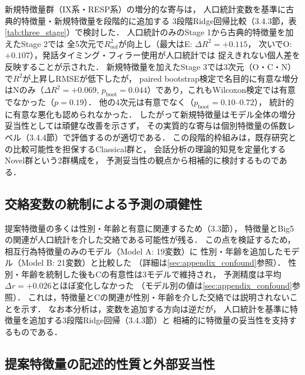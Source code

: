 \documentclass[dvipdfmx,11pt,a4paper]{bxjsarticle}
\renewcommand{\_}{\paperorigunderscore\allowbreak}%
\begin{document}
新規特徴量群（IX系・RESP系）の増分的な寄与は，
人口統計変数を基準に古典的特徴量・新規特徴量を段階的に追加する
3段階Ridge回帰比較（3.4.3節，表\ref{tab:three_stage}）で検討した．
人口統計のみのStage 1から古典的特徴量を加えたStage 2では
全5次元で$R^2_{\text{oof}}$が向上し（最大はE: $\Delta R^2 = +0.115$，
次いでO: $+0.107$），発話タイミング・フィラー使用が人口統計では
捉えきれない個人差を反映することが示された．
新規特徴量を加えたStage 3では3次元（O・C・N）で$R^2$が上昇しRMSEが低下したが，
paired bootstrap検定で名目的に有意な増分はNのみ（$\Delta R^2 = +0.069$,
$p_{\text{boot}} = 0.044$）であり，これもWilcoxon検定では有意でなかった（$p = 0.19$）．
他の4次元は有意でなく（$p_{\text{boot}} = 0.10$--$0.72$），
統計的に有意な悪化も認められなかった．
したがって新規特徴量はモデル全体の増分妥当性としては頑健な改善を示さず，
その実質的な寄与は個別特徴量の係数レベル（3.4.4節）で評価するのが適切である．
この段階的枠組みは，既存研究との比較可能性を担保するClassical群と，
会話分析の理論的知見を定量化するNovel群という2群構成を，
予測妥当性の観点から相補的に検討するものである．

\subsection{交絡変数の統制による予測の頑健性}


提案特徴量の多くは性別・年齢と有意に関連するため（3.3節），
特徴量とBig5の関連が人口統計を介した交絡である可能性が残る．
この点を検証するため，相互行為特徴量のみのモデル（Model A: 19変数）に
性別・年齢を追加したモデル（Model B: 21変数）と比較した
（詳細は\ref{sec:appendix_confound}参照）．
性別・年齢を統制した後もCの有意性は3モデルで維持され，
予測精度は平均$\Delta r = +0.026$とほぼ変化しなかった
（モデル別の値は\ref{sec:appendix_confound}参照）．
これは，特徴量とCの関連が性別・年齢を介した交絡では説明されないことを示す．
なお本分析は，変数を追加する方向は逆だが，
人口統計を基準に特徴量を追加する3段階Ridge回帰（3.4.3節）と
相補的に特徴量の妥当性を支持するものである．

\subsection{提案特徴量の記述的性質と外部妥当性}
\end{document}
